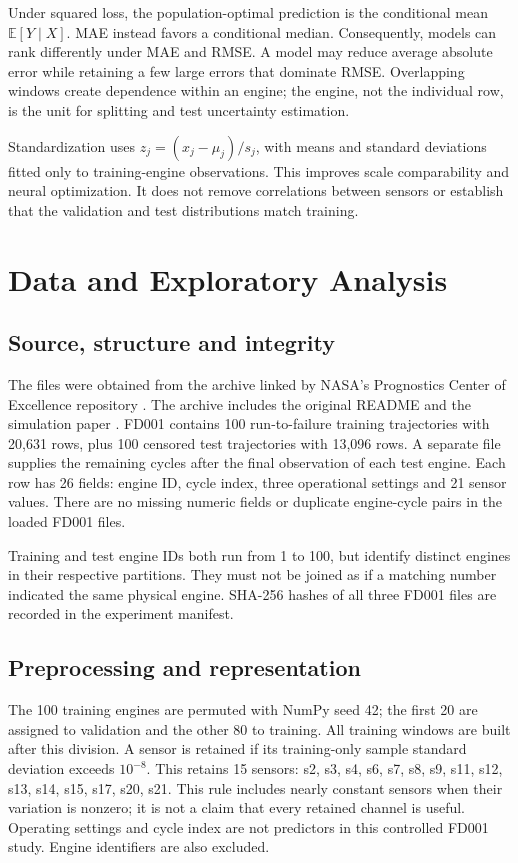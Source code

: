 \documentclass[11pt]{article}
\begin{document}
Under squared loss, the population-optimal prediction is the conditional mean $\mathbb{E}[Y\mid X]$. MAE instead favors a conditional median. Consequently, models can rank differently under MAE and RMSE. A model may reduce average absolute error while retaining a few large errors that dominate RMSE. Overlapping windows create dependence within an engine; the engine, not the individual row, is the unit for splitting and test uncertainty estimation.

Standardization uses $z_{j}=(x_j-\mu_j)/s_j$, with means and standard deviations fitted only to training-engine observations. This improves scale comparability and neural optimization. It does not remove correlations between sensors or establish that the validation and test distributions match training.
\section{Data and Exploratory Analysis}
\subsection{Source, structure and integrity}
The files were obtained from the archive linked by NASA's Prognostics Center of Excellence repository \cite{nasa}. The archive includes the original README and the simulation paper \cite{saxena}. FD001 contains 100 run-to-failure training trajectories with 20,631 rows, plus 100 censored test trajectories with 13,096 rows. A separate file supplies the remaining cycles after the final observation of each test engine. Each row has 26 fields: engine ID, cycle index, three operational settings and 21 sensor values. There are no missing numeric fields or duplicate engine-cycle pairs in the loaded FD001 files.

Training and test engine IDs both run from 1 to 100, but identify distinct engines in their respective partitions. They must not be joined as if a matching number indicated the same physical engine. SHA-256 hashes of all three FD001 files are recorded in the experiment manifest.

\subsection{Preprocessing and representation}
The 100 training engines are permuted with NumPy seed 42; the first 20 are assigned to validation and the other 80 to training. All training windows are built after this division. A sensor is retained if its training-only sample standard deviation exceeds $10^{-8}$. This retains 15 sensors: s2, s3, s4, s6, s7, s8, s9, s11, s12, s13, s14, s15, s17, s20, s21. This rule includes nearly constant sensors when their variation is nonzero; it is not a claim that every retained channel is useful. Operating settings and cycle index are not predictors in this controlled FD001 study. Engine identifiers are also excluded.
\end{document}
